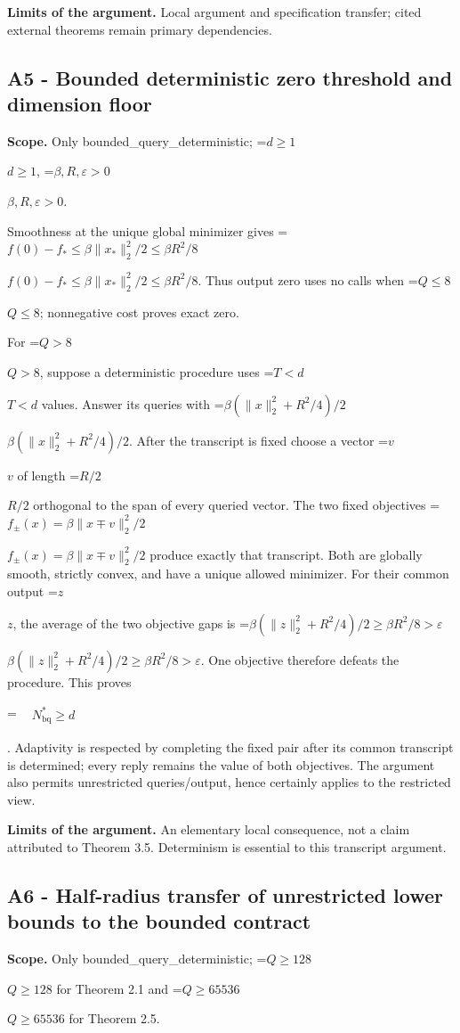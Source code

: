 \documentclass[10pt,a4paper]{article}
\newcommand{\AtlasMath}[1]{\par\begingroup\centering\setbox0=\hbox{$\displaystyle #1$}\ifdim\wd0>1.4\linewidth\typeout{ATLAS WIDE FORMULA: \the\wd0}\fi\ifdim\wd0>\linewidth\resizebox{\linewidth}{!}{\box0}\else\box0\fi\par\endgroup}
\newcommand{\AtlasInlineMath}[1]{\begingroup\setbox0=\hbox{$#1$}\ifdim\wd0>.4\linewidth\endgroup\AtlasMath{#1}\else\endgroup$#1$\fi}
\begin{document}
\textbf{Limits of the argument.} Local argument and specification transfer; cited external theorems remain primary dependencies.

\subsection{A5 - Bounded deterministic zero threshold and dimension floor}
\textbf{Scope.} Only bounded\_query\_deterministic; \AtlasInlineMath{d\ge1}, \AtlasInlineMath{\beta,R,\varepsilon>0}.

Smoothness at the unique global minimizer gives \AtlasInlineMath{f(0)-f_*\le\beta\|x_*\|_2^2/2\le\beta R^2/8}. Thus output zero uses no calls when \AtlasInlineMath{Q\le8}; nonnegative cost proves exact zero.

For \AtlasInlineMath{Q>8}, suppose a deterministic procedure uses \AtlasInlineMath{T<d} values. Answer its queries with \AtlasInlineMath{\beta(\|x\|_2^2+R^2/4)/2}. After the transcript is fixed choose a vector \AtlasInlineMath{v} of length \AtlasInlineMath{R/2} orthogonal to the span of every queried vector. The two fixed objectives \AtlasInlineMath{f_\pm(x)=\beta\|x\mp v\|_2^2/2} produce exactly that transcript. Both are globally smooth, strictly convex, and have a unique allowed minimizer. For their common output \AtlasInlineMath{z}, the average of the two objective gaps is \AtlasInlineMath{\beta(\|z\|_2^2+R^2/4)/2\ge\beta R^2/8>\varepsilon}. One objective therefore defeats the procedure. This proves 


\AtlasMath{\begin{aligned}&N_{\mathrm{bq}}^*\ge d\end{aligned}}


. Adaptivity is respected by completing the fixed pair after its common transcript is determined; every reply remains the value of both objectives. The argument also permits unrestricted queries/output, hence certainly applies to the restricted view.

\textbf{Limits of the argument.} An elementary local consequence, not a claim attributed to Theorem 3.5. Determinism is essential to this transcript argument.

\subsection{A6 - Half-radius transfer of unrestricted lower bounds to the bounded contract}
\textbf{Scope.} Only bounded\_query\_deterministic; \AtlasInlineMath{Q\ge128} for Theorem 2.1 and \AtlasInlineMath{Q\ge65536} for Theorem 2.5.
\end{document}
